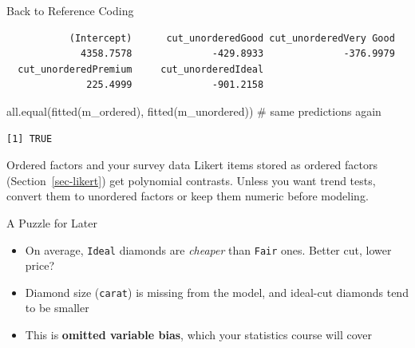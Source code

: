 \documentclass[
  ignorenonframetext,
  aspectratio=169,
]{beamer}
\newenvironment{Shaded}{\begin{snugshade}}{\end{snugshade}}
\newcommand{\AttributeTok}[1]{\textcolor[rgb]{0.40,0.45,0.13}{#1}}
\newcommand{\CommentTok}[1]{\textcolor[rgb]{0.37,0.37,0.37}{#1}}
\newcommand{\ConstantTok}[1]{\textcolor[rgb]{0.56,0.35,0.01}{#1}}
\newcommand{\FunctionTok}[1]{\textcolor[rgb]{0.28,0.35,0.67}{#1}}
\newcommand{\NormalTok}[1]{\textcolor[rgb]{0.00,0.23,0.31}{#1}}
\newcommand{\OtherTok}[1]{\textcolor[rgb]{0.00,0.23,0.31}{#1}}
\newcommand{\SpecialCharTok}[1]{\textcolor[rgb]{0.37,0.37,0.37}{#1}}
\providecommand{\tightlist}{%
  \setlength{\itemsep}{0pt}\setlength{\parskip}{0pt}}\usepackage{longtable,booktabs,array}
\begin{document}
\begin{frame}[fragile]{Back to Reference Coding}
\protect\hypertarget{back-to-reference-coding}{}
\begin{Shaded}
\end{Shaded}

\begin{verbatim}
           (Intercept)      cut_unorderedGood cut_unorderedVery Good 
             4358.7578              -429.8933              -376.9979 
  cut_unorderedPremium     cut_unorderedIdeal 
              225.4999              -901.2158 
\end{verbatim}

\begin{Shaded}
\begin{Highlighting}[]
\FunctionTok{all.equal}\NormalTok{(}\FunctionTok{fitted}\NormalTok{(m\_ordered), }\FunctionTok{fitted}\NormalTok{(m\_unordered))   }\CommentTok{\# same predictions again}
\end{Highlighting}
\end{Shaded}

\begin{verbatim}
[1] TRUE
\end{verbatim}

\begin{alertblock}{Ordered factors and your survey data}
\protect\hypertarget{ordered-factors-and-your-survey-data}{}
Likert items stored as ordered factors (Section~\ref{sec-likert}) get
polynomial contrasts. Unless you want trend tests, convert them to
unordered factors or keep them numeric before modeling.
\end{alertblock}
\end{frame}

\begin{frame}[fragile]{A Puzzle for Later}
\protect\hypertarget{a-puzzle-for-later}{}
\begin{itemize}
\tightlist
\item
  On average, \texttt{Ideal} diamonds are \emph{cheaper} than
  \texttt{Fair} ones. Better cut, lower price?
\item
  Diamond size (\texttt{carat}) is missing from the model, and ideal-cut
  diamonds tend to be smaller
\item
  This is \textbf{omitted variable bias}, which your statistics course
  will cover
\end{itemize}
\end{frame}
\end{document}
